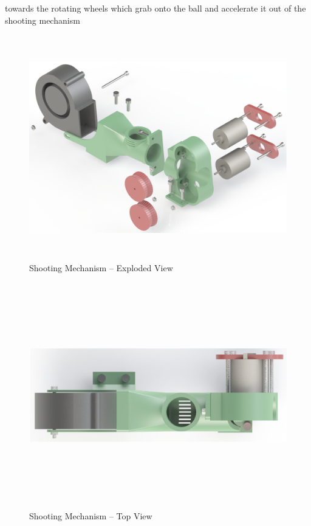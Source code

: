 towards the rotating wheels which grab onto the ball and accelerate it out of the shooting mechanism
\begin{figure}[H]   %
	\centering \includegraphics[width=6in, height=3.85in, keepaspectratio]{figures/shooter_explode.png}
	\caption{Shooting Mechanism -- Exploded View}	\label{fig:shooter_explode}
\end{figure}
\begin{figure}[H]   %
	\centering \includegraphics[width=6in, height=3.85in, keepaspectratio]{figures/shooter_top.png}
	\caption{Shooting Mechanism -- Top View}	\label{fig:shooter_top}
\end{figure}
